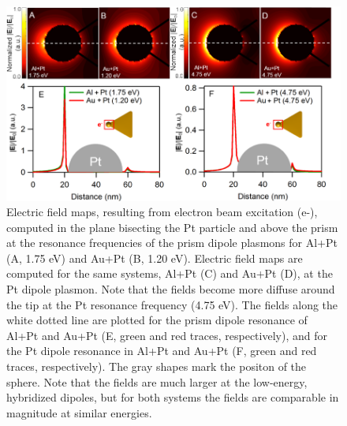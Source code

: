 \documentclass [11pt, proquest] {uwthesis}[2016/11/22]
\begin{document}
\begin{figure}
\includegraphics{prisms_field_calculations.png}
\caption{Electric field maps, resulting from electron beam excitation (e-), computed in the plane bisecting the Pt particle and above the prism at the resonance frequencies of the prism dipole plasmons for Al+Pt (A, 1.75 eV) and Au+Pt (B, 1.20 eV). Electric field maps are computed for the same systems, Al+Pt (C) and Au+Pt (D), at the Pt dipole plasmon. Note that the fields become more diffuse around the tip at the Pt resonance frequency (4.75 eV). The fields along the white dotted line are plotted for the prism dipole resonance of Al+Pt and Au+Pt (E, green and red traces, respectively), and for the Pt dipole resonance in Al+Pt and Au+Pt (F, green and red traces, respectively). The gray shapes mark the positon of the sphere. Note that the fields are much larger at the low-energy, hybridized dipoles, but for both systems the fields are comparable in magnitude at similar energies.}
\label{field_top}
\end{figure}
\end{document}

